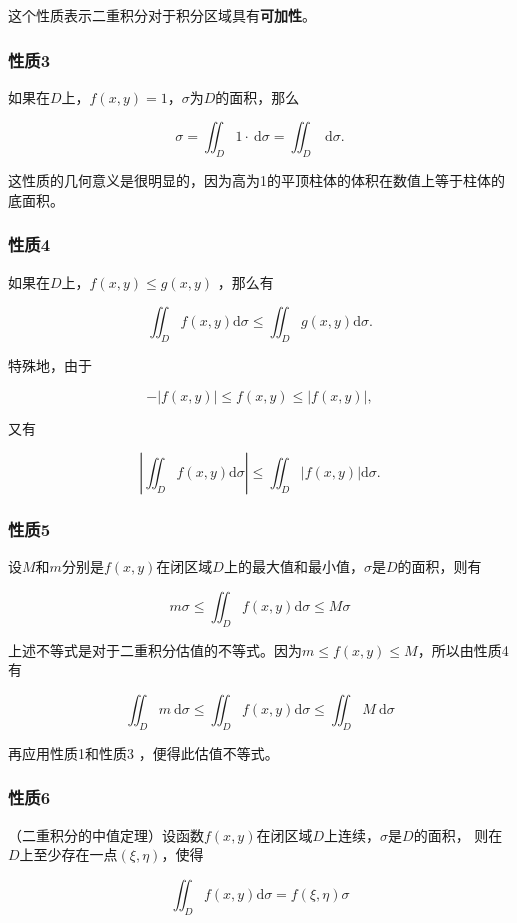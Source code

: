 \documentclass[12pt, a4paper]{article}
\numberwithin{equation}{section}
\begin{document}
    这个性质表示二重积分对于积分区域具有\textbf{可加性}。

\subsubsection{性质3}

    如果在$D$上，$f(x, y)=1$，$\sigma$为$D$的面积，那么

    $$
        \sigma=\iint_D 1 \cdot \mathrm{~d} \sigma=\iint_D \mathrm{~d} \sigma .
    $$

    这性质的几何意义是很明显的，因为高为1的平顶柱体的体积在数值上等于柱体的底面积。

\subsubsection{性质4}

    如果在$D$上，$f(x, y) \leq g(x, y)$ ，那么有
    
    $$
        \iint_D f(x, y) \mathrm{d} \sigma \leq \iint_D g(x, y) \mathrm{d} \sigma .
    $$

    特殊地，由于

    $$
    -|f(x, y)| \leq f(x, y) \leq|f(x, y)|,
    $$

    又有

    $$
        \left|\iint_D f(x, y) \mathrm{d} \sigma\right| \leq \iint_D|f(x, y)| \mathrm{d} \sigma .
    $$

\subsubsection{性质5}

    设$M$和$m$分别是$f(x, y)$在闭区域$D$上的最大值和最小值，$\sigma$是$D$的面积，则有
    
    $$
        m \sigma \leq \iint_D f(x, y) \mathrm{d} \sigma \leq M \sigma
    $$

    上述不等式是对于二重积分估值的不等式。因为$m \leq f(x, y) \leq M$，所以由性质4有

    $$
        \iint_D m \mathrm{~d} \sigma \leq \iint_D f(x, y) \mathrm{d} \sigma \leq \iint_D M \mathrm{~d} \sigma
    $$

    再应用性质1和性质3 ，便得此估值不等式。

\subsubsection{性质6}

    （二重积分的中值定理）设函数$f(x, y)$在闭区域$D$上连续，$\sigma$是$D$的面积，
    则在$D$上至少存在一点$(\xi, \eta)$，使得

    $$
        \iint_D f(x, y) \mathrm{d} \sigma=f(\xi, \eta) \sigma
    $$
\end{document}
